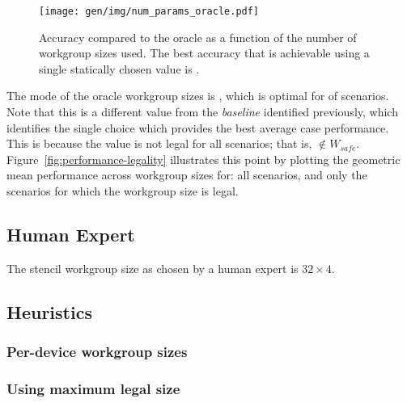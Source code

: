 \begin{figure}
\centering
\texttt{[image: gen/img/num\_params\_oracle.pdf]}
\caption{%
  Accuracy compared to the oracle as a function of the number of
  workgroup sizes used. The best accuracy that is achievable using a
  single statically chosen value is
  \protect.%
}
\label{fig:oracle-accuracy}
\end{figure}

The mode of the oracle workgroup sizes is
, which is optimal for
 of scenarios. Note that this is
a different value from the \emph{baseline} identified previously,
which identifies the single choice which provides the best average
case performance. This is because the value is not legal for all
scenarios; that is, $ \not\in W_{safe}$.
Figure~\ref{fig:performance-legality} illustrates this point by
plotting the geometric mean performance across workgroup sizes for:
all scenarios, and only the scenarios for which the workgroup size is
legal.




\subsection{Human Expert}


The stencil workgroup size as chosen by a human expert is
$32 \times 4$.




\subsection{Heuristics}

\subsubsection{Per-device workgroup sizes}


\subsubsection{Using maximum legal size}

